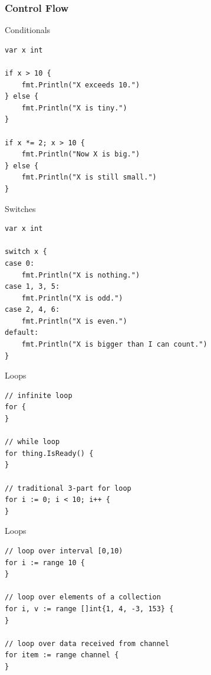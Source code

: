 \documentclass[pdf]{beamer}
\begin{document}
\subsubsection{Control Flow}
\begin{frame}[fragile]{Conditionals}
\begin{lstlisting}
var x int

if x > 10 {
    fmt.Println("X exceeds 10.")
} else {
    fmt.Println("X is tiny.")
}

if x *= 2; x > 10 {
    fmt.Println("Now X is big.")
} else {
    fmt.Println("X is still small.")
}
\end{lstlisting}
\end{frame}
\begin{frame}[fragile]{Switches}
\begin{lstlisting}
var x int

switch x {
case 0:
    fmt.Println("X is nothing.")
case 1, 3, 5:
    fmt.Println("X is odd.")
case 2, 4, 6:
    fmt.Println("X is even.")
default:
    fmt.Println("X is bigger than I can count.")
}
\end{lstlisting}
\end{frame}
\begin{frame}[fragile]{Loops}
\begin{lstlisting}
// infinite loop
for {
}

// while loop
for thing.IsReady() {
}

// traditional 3-part for loop
for i := 0; i < 10; i++ {
}
\end{lstlisting}
\end{frame}

\begin{frame}[fragile]{Loops}
\begin{lstlisting}
// loop over interval [0,10)
for i := range 10 {
}

// loop over elements of a collection
for i, v := range []int{1, 4, -3, 153} {
}

// loop over data received from channel
for item := range channel {
}
\end{lstlisting}
\end{frame}
\end{document}
